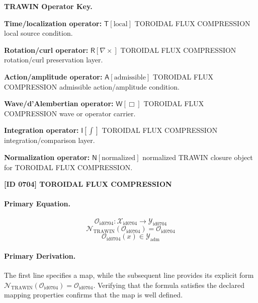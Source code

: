 \par\vspace{0.45\baselineskip}
\noindent\begin{minipage}[t]{\linewidth}
\begingroup
\small
\raggedright
\textbf{TRAWIN Operator Key.}\par
\noindent\textbf{Time/localization operator:} $\mathsf{T}\!\left[\mathrm{local}\right]$ TOROIDAL FLUX COMPRESSION local source condition.\par
\noindent\textbf{Rotation/curl operator:} $\mathsf{R}\!\left[\nabla\times\right]$ TOROIDAL FLUX COMPRESSION rotation/curl preservation layer.\par
\noindent\textbf{Action/amplitude operator:} $\mathsf{A}\!\left[\mathrm{admissible}\right]$ TOROIDAL FLUX COMPRESSION admissible action/amplitude condition.\par
\noindent\textbf{Wave/d'Alembertian operator:} $\mathsf{W}\!\left[\Box\right]$ TOROIDAL FLUX COMPRESSION wave or operator carrier.\par
\noindent\textbf{Integration operator:} $\mathsf{I}\!\left[\int\right]$ TOROIDAL FLUX COMPRESSION integration/comparison layer.\par
\noindent\textbf{Normalization operator:} $\mathsf{N}\!\left[\mathrm{normalized}\right]$ normalized TRAWIN closure object for TOROIDAL FLUX COMPRESSION.\par
\endgroup
\end{minipage}

\clearpage
\noindent\textbf{[ID 0704] TOROIDAL FLUX COMPRESSION}\par
\vspace{0.35em}
\paragraph{Primary Equation.}
\[
\mathcal{O}_{\mathrm{id0704}}:\mathcal{X}_{\mathrm{id0704}}\longrightarrow\mathcal{Y}_{\mathrm{id0704}}
\]
\[
\mathcal{N}_{\mathrm{TRAWIN}}(\mathcal{O}_{\mathrm{id0704}})=\mathcal{O}_{\mathrm{id0704}}
\]
\[
\mathcal{O}_{\mathrm{id0704}}(x)\in\mathcal{Y}_{\mathrm{adm}}
\]

\paragraph{Primary Derivation.}
The first line specifies a map, while the subsequent line provides its explicit form \( \mathcal{N}_{\mathrm{TRAWIN}}(\mathcal{O}_{\mathrm{id0704}})=\mathcal{O}_{\mathrm{id0704}} \). Verifying that the formula satisfies the declared mapping properties confirms that the map is well defined.
